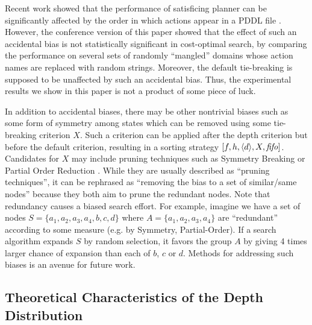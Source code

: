 Recent work  showed that the performance of satisficing
planner can be significantly affected by the order in which actions appear in a PDDL file \cite{vallati2015effective}.
However, the conference version of this paper \cite{Asai2016} showed that
the effect of such an accidental bias is not statistically significant in cost-optimal search,
by comparing the performance on
several sets of randomly ``mangled'' domains whose action names are replaced with random strings.
Moreover, the \ro default tie-breaking is supposed to be unaffected by such an accidental bias.
Thus, the experimental results we show in this paper is not a product of some piece of luck.

In addition to accidental biases, there may be other nontrivial biases such as some form of symmetry among states which can be removed using some tie-breaking criterion $X$.
Such a criterion can be applied after the depth criterion but before the default criterion,
resulting in a sorting strategy $[f,h,{\left<d\right>},X,{\text{\textit{fifo}}}]$. 
Candidates for $X$ may
include pruning techniques such as Symmetry Breaking \cite{Fox1998,pochter2011exploiting,domshlak2013symmetry} or
Partial Order Reduction \cite{hall2013faster,wehrle2013relative}.
While they are usually described as ``pruning techniques'',
it can be rephrased as ``removing the bias to a set of similar/same nodes'' because
they both aim to prune the redundant nodes.
Note that redundancy causes a biased search effort. For example, imagine we have a
set of nodes $S=\{a_1, a_2, a_3, a_4, b, c, d\}$ where
$A=\{a_1, a_2, a_3, a_4\}$ are ``redundant'' according to some measure (e.g. by Symmetry,
Partial-Order). 
If a search algorithm expands $S$ by random selection, it favors the
group $A$ by giving 4 times larger chance of expansion than each of $b$,
$c$ or $d$.
Methods for addressing such biases is an avenue for future work.



\subsection{Theoretical Characteristics of the Depth Distribution}
\label{sec:theoretical-characteristics}

